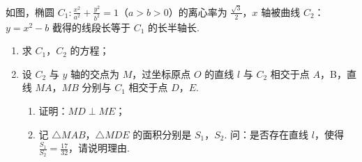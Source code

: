 \begin{problem}
如图，椭圆 \(C_{1}:\frac{x^{2}}{a^{2}} +\frac{y^{2}}{b^{2}} = 1\)（\(a > b > 0\)）的离心率为 \(\frac{\sqrt{3}}{2}\)，\(x\) 轴被曲线 \(C_2\)：\(y = x^{2} - b\) 截得的线段长等于 \(C_1\) 的长半轴长.
\begin{enumerate}
\item 求 \(C_1\)，\(C_2\) 的方程；
\item 设 \(C_2\) 与 \(y\) 轴的交点为 \(M\)，过坐标原点 \(O\) 的直线 \(l\) 与 \(C_2\) 相交于点 \(A\)，B，直线 \(MA\)，\(MB\) 分别与 \(C_1\) 相交于点 \(D\)，\(E\).
\begin{enumerate}
\item 证明：\(MD \perp ME\)；
\item 记 \(\triangle MAB\)，\(\triangle MDE\) 的面积分别是 \(S_{1}\)，\(S_{2}\). 问：是否存在直线 \(l\)，使得 \(\frac{S_{1}}{S_{2}} = \frac{17}{32}\)，请说明理由.
\end{enumerate}
\end{enumerate}

\end{problem}

